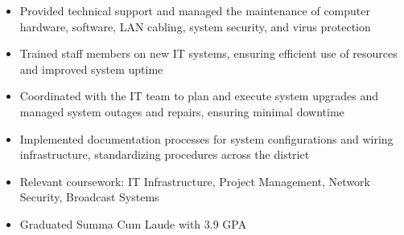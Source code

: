 \par\smallskip
\begin{minipage}{13.75cm}
  \begin{minipage}{6.5cm}
    \begin{itemize}
      \item Provided technical support and managed the maintenance of computer hardware, software, LAN cabling, system security, and virus protection
      \item Trained staff members on new IT systems, ensuring efficient use of resources and improved system uptime
    \end{itemize}
  \end{minipage}
  \hfill
  \begin{minipage}{6.5cm}
    \begin{itemize}
      \item Coordinated with the IT team to plan and execute system upgrades and managed system outages and repairs, ensuring minimal downtime
      \item Implemented documentation processes for system configurations and wiring infrastructure, standardizing procedures across the district
    \end{itemize}
  \end{minipage}
\end{minipage}

\par\bigskip
{}
\begin{itemize}
  \item Relevant coursework: IT Infrastructure, Project Management, Network Security, Broadcast Systems
\end{itemize}
\divider

\begin{itemize}
  \item Graduated Summa Cum Laude with 3.9 GPA
\end{itemize}


